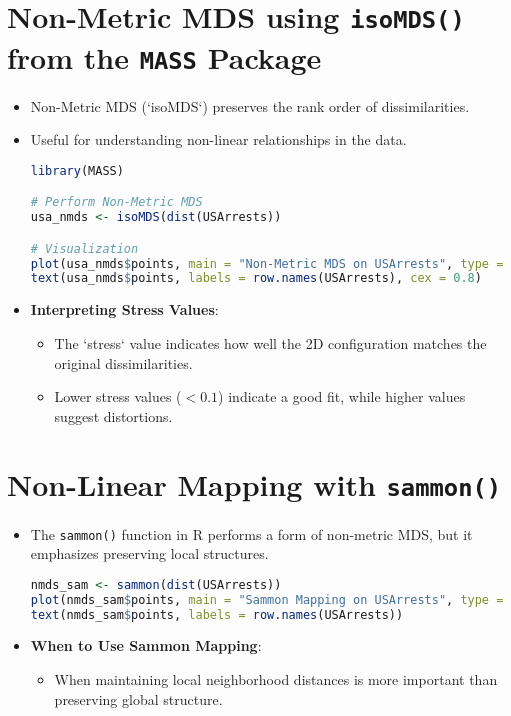 \section{Non-Metric MDS using \texttt{isoMDS()} from the \texttt{MASS} Package}
\begin{itemize}
    \item Non-Metric MDS (`isoMDS`) preserves the rank order of dissimilarities.
    \item Useful for understanding non-linear relationships in the data.
\begin{lstlisting}[language=R, breaklines=true]
library(MASS)

# Perform Non-Metric MDS
usa_nmds <- isoMDS(dist(USArrests))

# Visualization
plot(usa_nmds$points, main = "Non-Metric MDS on USArrests", type = "n")
text(usa_nmds$points, labels = row.names(USArrests), cex = 0.8)
\end{lstlisting}
\item \textbf{Interpreting Stress Values}:
    \begin{itemize}
        \item The `stress` value indicates how well the 2D configuration matches the original dissimilarities.
        \item Lower stress values (\(< 0.1\)) indicate a good fit, while higher values suggest distortions.
    \end{itemize}
\end{itemize}

\section{Non-Linear Mapping with \texttt{sammon()}}
\begin{itemize}
    \item The \texttt{sammon()} function in R performs a form of non-metric MDS, but it emphasizes preserving local structures.
\begin{lstlisting}[language=R, breaklines=true]
nmds_sam <- sammon(dist(USArrests))
plot(nmds_sam$points, main = "Sammon Mapping on USArrests", type = "n")
text(nmds_sam$points, labels = row.names(USArrests))
\end{lstlisting}
\item \textbf{When to Use Sammon Mapping}:
    \begin{itemize}
        \item When maintaining local neighborhood distances is more important than preserving global structure.
    \end{itemize}
\end{itemize}

